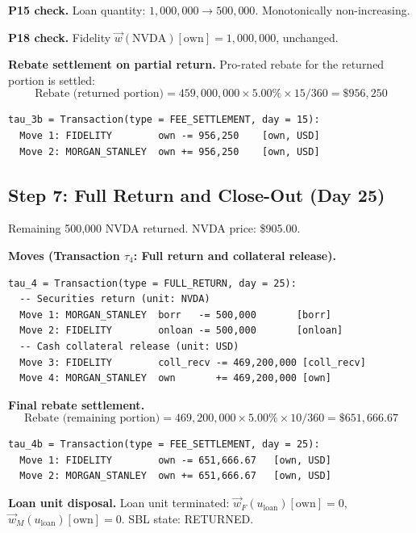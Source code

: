 \documentclass[11pt,a4paper]{article}
\begin{document}
\noindent\textbf{P15 check.} Loan quantity: $1{,}000{,}000 \to 500{,}000$. Monotonically non-increasing. \checkmark

\noindent\textbf{P18 check.} Fidelity $\vec{w}(\text{NVDA})[\mathrm{own}] = 1{,}000{,}000$, unchanged. \checkmark

\noindent\textbf{Rebate settlement on partial return.} Pro-rated rebate for the returned portion is settled:
\[
\text{Rebate (returned portion)} = 459{,}000{,}000 \times 5.00\% \times 15/360 = \$956{,}250
\]

\begin{lstlisting}
tau_3b = Transaction(type = FEE_SETTLEMENT, day = 15):
  Move 1: FIDELITY        own -= 956,250    [own, USD]
  Move 2: MORGAN_STANLEY  own += 956,250    [own, USD]
\end{lstlisting}

\subsection{Step 7: Full Return and Close-Out (Day 25)}
\label{sec:us-step7}

Remaining 500{,}000 NVDA returned. NVDA price: \$905.00.

\medskip
\noindent\textbf{Moves (Transaction $\tau_4$: Full return and collateral release).}

\begin{lstlisting}
tau_4 = Transaction(type = FULL_RETURN, day = 25):
  -- Securities return (unit: NVDA)
  Move 1: MORGAN_STANLEY  borr   -= 500,000       [borr]
  Move 2: FIDELITY        onloan -= 500,000       [onloan]
  -- Cash collateral release (unit: USD)
  Move 3: FIDELITY        coll_recv -= 469,200,000 [coll_recv]
  Move 4: MORGAN_STANLEY  own       += 469,200,000 [own]
\end{lstlisting}

\medskip
\noindent\textbf{Final rebate settlement.}
\[
\text{Rebate (remaining portion)} = 469{,}200{,}000 \times 5.00\% \times 10/360 = \$651{,}666.67
\]

\begin{lstlisting}
tau_4b = Transaction(type = FEE_SETTLEMENT, day = 25):
  Move 1: FIDELITY        own -= 651,666.67   [own, USD]
  Move 2: MORGAN_STANLEY  own += 651,666.67   [own, USD]
\end{lstlisting}

\medskip
\noindent\textbf{Loan unit disposal.} Loan unit terminated: $\vec{w}_F(u_{\mathrm{loan}})[\mathrm{own}] = 0$, $\vec{w}_M(u_{\mathrm{loan}})[\mathrm{own}] = 0$. SBL state: RETURNED.
\end{document}

